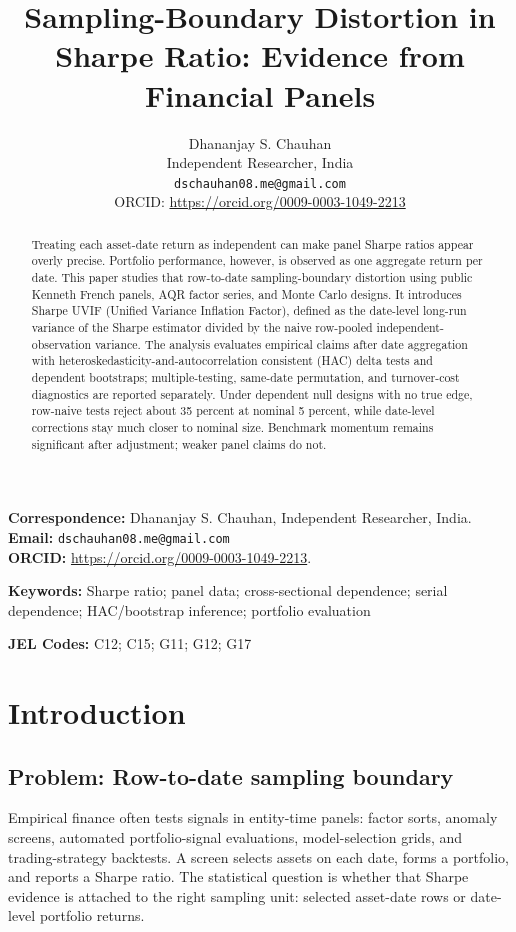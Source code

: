 \documentclass[12pt,a4paper]{article}
\title{Sampling-Boundary Distortion in Sharpe Ratio: Evidence from Financial Panels}
\author{}
\author{Dhananjay S. Chauhan\\
Independent Researcher, India\\
\texttt{dschauhan08.me@gmail.com}\\
ORCID: \url{https://orcid.org/0009-0003-1049-2213}}
\date{}
\newif\ifblinded
\begin{document}
\linenumbers
\maketitle

\ifblinded
\else
\noindent\textbf{Correspondence:} Dhananjay S. Chauhan, Independent
Researcher, India.\\
\textbf{Email:} \texttt{dschauhan08.me@gmail.com}\\
\textbf{ORCID:} \url{https://orcid.org/0009-0003-1049-2213}.
\fi

\begin{abstract}
Treating each asset-date return as independent can make panel Sharpe
ratios appear overly precise. Portfolio performance, however, is
observed as one aggregate return per date. This paper studies that
row-to-date sampling-boundary distortion using public Kenneth French
panels, AQR factor series, and Monte Carlo designs. It introduces Sharpe
UVIF (Unified Variance Inflation Factor), defined as the date-level
long-run variance of the Sharpe estimator divided by the naive
row-pooled independent-observation variance. The analysis evaluates
empirical claims after date aggregation with
heteroskedasticity-and-autocorrelation consistent (HAC) delta tests and
dependent bootstraps; multiple-testing, same-date permutation, and
turnover-cost diagnostics are reported separately. Under dependent null
designs with no true edge, row-naive tests reject about 35 percent at
nominal 5 percent, while date-level corrections stay much closer to
nominal size. Benchmark momentum remains significant after adjustment;
weaker panel claims do not.
\end{abstract}

\noindent\textbf{Keywords:} Sharpe ratio; panel data; cross-sectional dependence;
serial dependence; HAC/bootstrap inference; portfolio evaluation

\noindent\textbf{JEL Codes:} C12; C15; G11; G12; G17

\section{Introduction}

\subsection{Problem: Row-to-date sampling boundary}

Empirical finance often tests signals in entity-time panels: factor
sorts, anomaly screens, automated portfolio-signal evaluations,
model-selection grids, and trading-strategy backtests.  A screen selects
assets on each date, forms a portfolio, and reports a Sharpe ratio.  The
statistical question is whether that Sharpe evidence is attached to the
right sampling unit: selected asset-date rows or date-level portfolio
returns.
\end{document}
